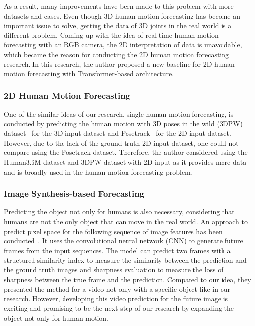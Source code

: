 As a result, many improvements have been made to this problem with more datasets and cases. Even though 3D human motion forecasting has become an important issue to solve, getting the data of 3D joints in the real world is a different problem. Coming up with the idea of real-time human motion forecasting with an RGB camera, the 2D interpretation of data is unavoidable, which became the reason for conducting the 2D human motion forecasting research. In this research, the author proposed a new baseline for 2D human motion forecasting with Transformer-based architecture.


\subsubsection{2D Human Motion Forecasting}
One of the similar ideas of our research, single human motion forecasting, is conducted by predicting the human motion with 3D poses in the wild (3DPW) dataset~\cite{vonMarcard2018} for the 3D input dataset and Posetrack~\cite{posetrack} for the 2D input dataset.
However, due to the lack of the ground truth 2D input dataset, one could not compare using the Posetrack dataset.
Therefore, the author considered using the Human3.6M dataset and 3DPW dataset with 2D input as it provides more data and is broadly used in the human motion forecasting problem.

\subsubsection{Image Synthesis-based Forecasting}
Predicting the object not only for humans is also necessary, considering that humans are not the only object that can move in the real world.
An approach to predict pixel space for the following sequence of image features has been conducted~\cite{mathieu2015}.
It uses the convolutional neural network (CNN) to generate future frames from the input sequences.
The model can predict two frames with a structured similarity index to measure the similarity between the prediction and the ground truth images and sharpness evaluation to measure the loss of sharpness between the true frame and the prediction. Compared to our idea, they presented the method for a video not only with a specific object like in our research.
However, developing this video prediction for the future image is exciting and promising to be the next step of our research by expanding the object not only for human motion. 


